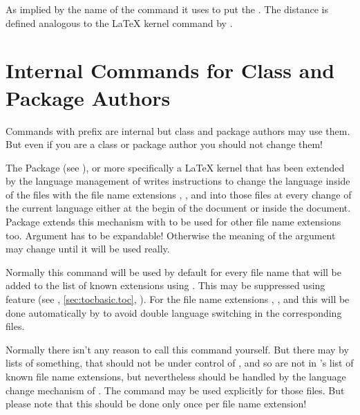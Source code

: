 As implied by the name of the command it uses  to put the
. The distance is defined analogous to the \LaTeX{} kernel
command  by
.%
\EndIndexGroup
%
\EndIndexGroup


\section{Internal Commands for Class and Package Authors}
\label{sec:tocbasic.internals}

Commands with prefix  are internal but class and package
authors may use them. But even if you are a class or package author you
should not change them!

\begin{Declaration}
\end{Declaration}
The Package  (see \cite{package:babel}),
or more specifically a \LaTeX{} kernel that has been extended by the language
management of  writes instructions to change the language
inside of the files with the file name extensions , , and
 into those files at every change of the current language either at
the begin of the document or inside the document. Package 
extends this mechanism with  to be used for other
file name extensions too. Argument  has to be expandable!
Otherwise the meaning of the argument may change until it will be used really.

Normally this command will be used by default for every file name
 that will be added to the list of known extensions using
. This may be suppressed using feature
 (see ,
\autoref{sec:tocbasic.toc}, ). For the
file name extensions , , and  this will be done
automatically by  to avoid double language switching in the
corresponding files.

Normally there isn't any reason to call this command yourself. But there may
by lists of something, that should not be under control of ,
and so are not in 's list of known file name extensions, but
nevertheless should be handled by the language change mechanism of
. The command may be used explicitly for those files. But please
note that this should be done only once per file name extension!%
\EndIndexGroup


